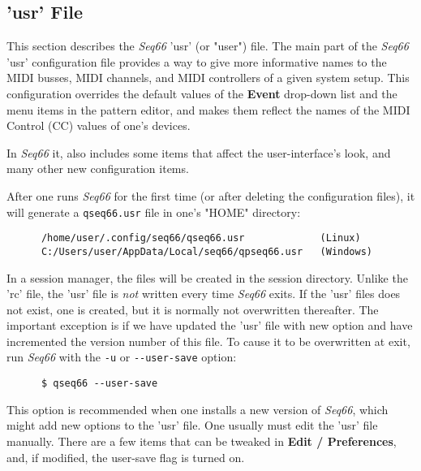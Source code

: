 \subsection{'usr' File}
\label{subsec:configuration_usr}

   This section describes the \textsl{Seq66} 'usr' (or "user") file.
   The main part of the \textsl{Seq66} 'usr'
   configuration file provides a way to give more
   informative names to the MIDI busses, MIDI channels, and MIDI controllers of
   a given system setup.
   This configuration overrides the default values
   of the \textbf{Event} drop-down list and the menu items in the pattern editor,
   and makes them reflect the names of the MIDI Control (CC) values of one's
   devices.

   In \textsl{Seq66} it, also includes some items that affect the
   user-interface's look, and many other new configuration items.

   After one runs \textsl{Seq66} for the first time (or after deleting
   the configuration files), it will generate a
   \texttt{qseq66.usr} file in one's "HOME" directory:

   \begin{verbatim}
      /home/user/.config/seq66/qseq66.usr             (Linux)
      C:/Users/user/AppData/Local/seq66/qpseq66.usr   (Windows)
   \end{verbatim}

   In a session manager, the files will be created in the session directory.
   Unlike the 'rc' file, the 'usr' file is \textsl{not} written every time
   \textsl{Seq66} exits.  If the 'usr' files does not exist, one is
   created, but it is normally not overwritten thereafter.
   The important exception is if we have updated the 'usr' file with new option
   and have incremented the version number of this file.
   To cause it to be overwritten at exit, run \textsl{Seq66} with the
   \texttt{-u} or \texttt{-{}-user-save} option:

   \begin{verbatim}
      $ qseq66 --user-save
   \end{verbatim}

   This option is recommended when one installs a new version of
   \textsl{Seq66}, which might add new options to the 'usr' file.
   One usually must edit the 'usr' file manually.
   There are a few items that can be tweaked in \textbf{Edit / Preferences},
   and, if modified, the user-save flag is turned on.

